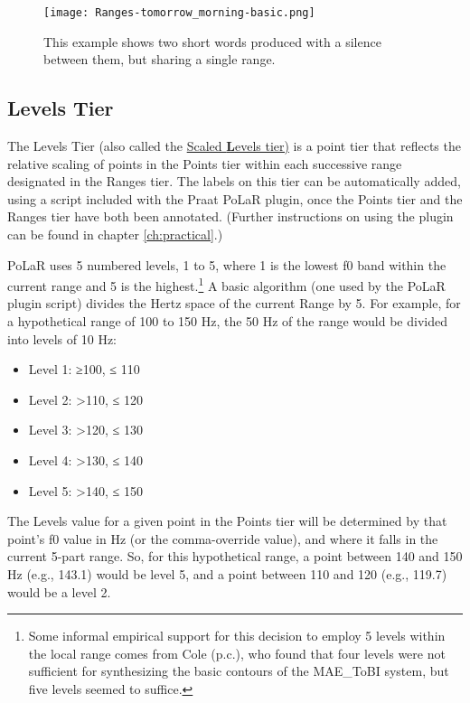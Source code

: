 \begin{figure}[H]
\centering
%
\texttt{[image: Ranges-tomorrow\_morning-basic.png]}
%
\caption{This example shows two short words produced with a silence between them, but sharing a single range.%
\label{fig:tomorrow_morning Ranges basic}%
%
}
\end{figure}

\subsection{Levels Tier}\label{sec:levels}

The Levels Tier (also called the \uline{Scaled \textbf{L}evels tier)} is a point tier that reflects the relative scaling of points in the Points tier within each successive range designated in the Ranges tier. The labels on this tier can be automatically added, using a script included with the Praat PoLaR plugin, once the Points tier and the Ranges tier have both been annotated. (Further instructions on using the plugin can be found in chapter \ref{ch:practical}.)

PoLaR uses 5 numbered levels, 1 to 5, where 1 is the lowest f0 band within the current range and 5 is the highest.\footnote{Some informal empirical support for this decision to employ 5 levels within the local range comes from Cole (p.c.), who found that four levels were not sufficient for synthesizing the basic contours of the MAE\_ToBI system, but five levels seemed to suffice.} A basic algorithm (one used by the PoLaR plugin script) divides the Hertz space of the current Range by 5. For example, for a hypothetical range of 100 to 150 Hz, the 50 Hz of the range would be divided into levels of 10 Hz:

\begin{itemize}
\item Level 1: ≥100, ≤ 110
\item Level 2: >110, ≤ 120
\item Level 3: >120, ≤ 130
\item Level 4: >130, ≤ 140
\item Level 5: >140, ≤ 150 \end{itemize}

The Levels value for a given point in the Points tier will be determined by that point’s f0 value in Hz (or the comma-override value), and where it falls in the current 5-part range. So, for this hypothetical range, a point between 140 and 150 Hz (e.g., 143.1) would be level 5, and a point between 110 and 120 (e.g., 119.7) would be a level 2.

